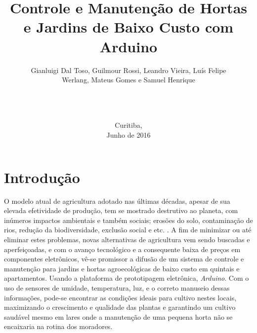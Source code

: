\documentclass[a4paper,12pt]{article}
\begin{document}
\title{Controle e Manutenção de Hortas e Jardins de Baixo Custo com Arduino}
\author{Gianluigi Dal Toso, Guilmour Rossi, Leandro Vieira, Luís Felipe\\Werlang, Mateus Gomes e Samuel Henrique\\\texttt{}\\\\\\
}

\date{Curitiba, \\Junho de 2016}

\maketitle

\newpage


\tableofcontents


\newpage

\listoffigures



\makenomenclature

\newpage
\section{Introdução}

O modelo atual de agricultura adotado nas últimas décadas, apesar de sua elevada efetividade de produção, tem se mostrado destrutivo ao planeta, com inúmeros impactos ambientais e também sociais; erosões do solo, contaminação de rios, redução da biodiversidade, exclusão social e etc. \cite[p.~23]{medeiros}. A fim de minimizar ou até eliminar estes problemas, novas alternativas de agricultura vem sendo buscadas e aperfeiçoadas, e com o avanço tecnológico e a consequente baixa de preços em componentes  eletrônicos, vê-se promissor a difusão de um sistema de controle e manutenção para jardins e hortas agroecológicas de baixo custo em quintais e apartamentos. Usando a plataforma de prototipagem eletrônica, \textit{Arduino}. Com o uso de sensores de umidade, temperatura, luz, e o correto manuseio dessas informações, pode-se encontrar as condições ideais para cultivo nestes locais, maximizando o crescimento e qualidade das plantas e garantindo um cultivo saudável mesmo em lares onde a manutenção de uma pequena horta não se encaixaria na rotina dos moradores.
\end{document}
